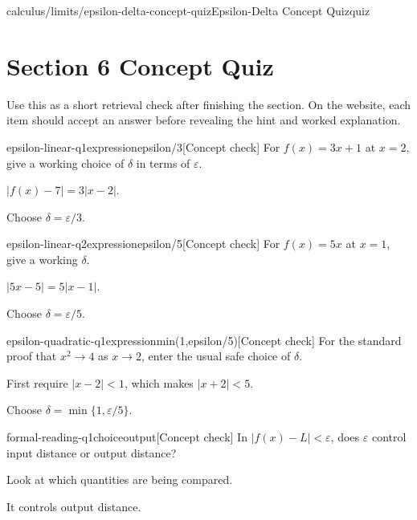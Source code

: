 \documentclass[11pt,openany]{book}
\theoremstyle{bgplain}
\newcounter{bgcheck}[section]
\begin{document}
\begin{webpage}{calculus/limits/epsilon-delta-concept-quiz}{Epsilon-Delta Concept Quiz}{quiz}
\section*{Section 6 Concept Quiz}

Use this as a short retrieval check after finishing the section. On the website, each item should accept an answer before revealing the hint and worked explanation.

\begin{bgcheck}{epsilon-linear-q1}{expression}{epsilon/3}[Concept check]
For \(f(x)=3x+1\) at \(x=2\), give a working choice of \(\delta\) in terms of \(\varepsilon\).
\begin{bghint}
\(|f(x)-7|=3|x-2|\).
\end{bghint}
\begin{bgreveal}
Choose \(\delta=\varepsilon/3\).
\end{bgreveal}
\end{bgcheck}

\begin{bgcheck}{epsilon-linear-q2}{expression}{epsilon/5}[Concept check]
For \(f(x)=5x\) at \(x=1\), give a working \(\delta\).
\begin{bghint}
\(|5x-5|=5|x-1|\).
\end{bghint}
\begin{bgreveal}
Choose \(\delta=\varepsilon/5\).
\end{bgreveal}
\end{bgcheck}

\begin{bgcheck}{epsilon-quadratic-q1}{expression}{min(1,epsilon/5)}[Concept check]
For the standard proof that \(x^2\to4\) as \(x\to2\), enter the usual safe choice of \(\delta\).
\begin{bghint}
First require \(|x-2|<1\), which makes \(|x+2|<5\).
\end{bghint}
\begin{bgreveal}
Choose \(\delta=\min\{1,\varepsilon/5\}\).
\end{bgreveal}
\end{bgcheck}

\begin{bgcheck}{formal-reading-q1}{choice}{output}[Concept check]
In \(|f(x)-L|<\varepsilon\), does \(\varepsilon\) control input distance or output distance?
\begin{bghint}
Look at which quantities are being compared.
\end{bghint}
\begin{bgreveal}
It controls output distance.
\end{bgreveal}
\end{bgcheck}


\end{webpage}
\end{document}
